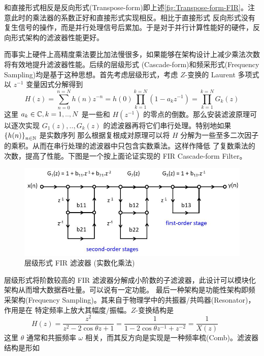 和直接形式相反是反向形式(Transpose-form)即上述\ref{fig:Transpose-form-FIR}。注意此时的乘法器的系数正好和直接形式实现相反。相比于直接形式
反向形式没有复生信号的操作，而是并行处理信号后累加。于是对于并行计算性能好的硬件，反向形式架构的滤波器性能更好。

而事实上硬件上高精度乘法要比加法慢很多，如果能够在架构设计上减少乘法次数将有效地提升滤波器性能。后续的层级形式
(Cascade-form)和频采形式(Frequency Sampling)均是基于这种思想。首先考虑层级形式，考虑 $Z$-变换的 Laurent 
多项式以 $z^{-1}$ 变量因式分解得到
\begin{equation*}
    H(z) = \sum_{n=0}^{n=N}h(n)z^{-n} = h(0)\prod_{k=1}^{k=N}(1- a_k z^{-1}) = \prod_{k=1}^{k=N} G_k (z)
\end{equation*}
这里 $a_k \in \mathbb{C}, k=1,..,N$ 是一些和 $H(z^{-1})$ 的零点的倒数。那么安装滤波原理可以逐次实现
$G_1(z),..,G_k (z)$ 的滤波器再将它们串行处理。特别地如果 $\left\{h(n)\right\}_{n\in\mathbb{N}}$ 是实数序列
那么根据复根成对原理可以将 $H$ 分解为一些至多二次因子的乘积。从而在串行处理的滤波器中只包含实数乘法。这样作降低
了复数乘法的次数，提高了性能。下图是一个按上面论证实现的 FIR Cascade-form Filter。
\begin{center}
    \begin{figure}[ht!]
        \centering
        \includegraphics[scale = 0.5]{figures/FIR_Cascade.jpg}
        \caption{层级形式 FIR 滤波器 (实数化乘法)}
        \label{fig:Cascade-form-FIR}
    \end{figure}
\end{center}
层级形式将阶数较高的 FIR 滤波器分解成小阶数的子滤波器，此设计可以模块化架构从而增大数据吞吐量。可以说有一定功能。
最后一种架构是功能性架构即频采架构(Frequency Sampling)。其来自于物理学中的共振器/共鸣器(Resonator)，作用是在
特定频率上放大其幅度/振幅。$Z$-变换结构是
\begin{equation*}
    H(z) = \frac{z^2}{z^2 - 2 \cos \theta z + 1} = \frac{1}{1 - 2\cos \theta z^{-1} + z^{-2}} = \frac{1}{X(z)} \qquad \tag{A3}
\end{equation*}
这里 $\theta$ 通常和共振频率 $\omega$ 相关，而其反方向是实现是一种频率梳(Comb)。滤波器结构是形如

